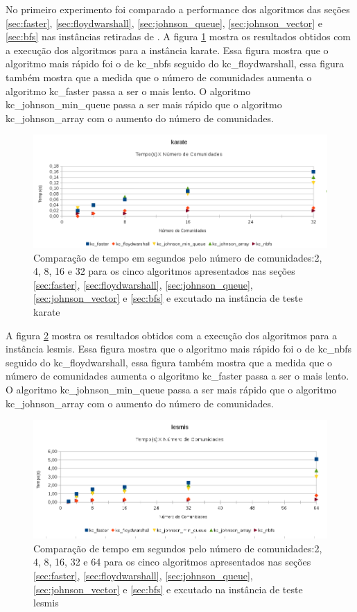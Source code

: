 No primeiro experimento foi comparado a performance dos algoritmos das seções \ref{sec:faster}, \ref{sec:floydwarshall}, \ref{sec:johnson_queue}, \ref{sec:johnson_vector} e \ref{sec:bfs} nas instâncias retiradas de \cite{files_test}.
A figura \ref{karate} mostra os resultados obtidos com a execução dos algoritmos para a instância karate. Essa figura mostra
que o algoritmo mais rápido foi o de kc\_nbfs seguido do kc\_floydwarshall, essa figura também mostra que a medida
que o número de comunidades aumenta o algoritmo kc\_faster passa a ser o mais lento. O algoritmo kc\_johnson\_min\_queue
passa a ser mais rápido que o algoritmo kc\_johnson\_array com o aumento do número de comunidades.

\begin{figure}
\centering
\includegraphics[width=6in]{karate.png}
\caption{Comparação de tempo em segundos pelo número de comunidades:2, 4, 8, 16 e 32 para os cinco algoritmos apresentados nas seções \ref{sec:faster}, \ref{sec:floydwarshall}, \ref{sec:johnson_queue}, \ref{sec:johnson_vector} e \ref{sec:bfs} e excutado na instância de teste karate}
\label{karate}
\end{figure}

A figura \ref{lesmis} mostra os resultados obtidos com a execução dos algoritmos para a instância lesmis. Essa figura mostra
que o algoritmo mais rápido foi o de kc\_nbfs seguido do kc\_floydwarshall, essa figura também mostra que a medida
que o número de comunidades aumenta o algoritmo kc\_faster passa a ser o mais lento. O algoritmo kc\_johnson\_min\_queue
passa a ser mais rápido que o algoritmo kc\_johnson\_array com o aumento do número de comunidades.

\begin{figure}
\centering
\includegraphics[width=6in]{lesmis.png}
\caption{Comparação de tempo em segundos pelo número de comunidades:2, 4, 8, 16, 32 e 64 para os cinco algoritmos apresentados nas seções \ref{sec:faster}, \ref{sec:floydwarshall}, \ref{sec:johnson_queue}, \ref{sec:johnson_vector} e \ref{sec:bfs} e excutado na instância de teste lesmis}
\label{lesmis}
\end{figure}

